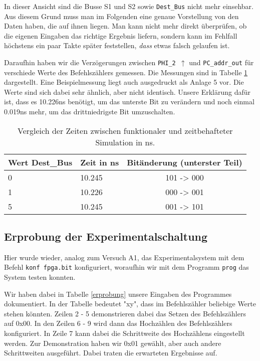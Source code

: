 \documentclass[12pt,a4paper]{scrartcl}
\begin{document}
In dieser Ansicht sind die Busse S1 und S2 sowie \texttt{Dest\_Bus} nicht mehr einsehbar.
Aus diesem Grund muss man im Folgenden eine genaue Vorstellung von den Daten haben, die auf ihnen liegen.
Man kann nicht mehr direkt \"uberpr\"ufen, ob die eigenen Eingaben das richtige Ergebnis liefern, sondern kann im Fehlfall h\"ochstens ein paar Takte sp\"ater feststellen, \emph{dass} etwas falsch gelaufen ist.

Daraufhin haben wir die Verz\"ogerungen zwischen \texttt{PHI\_2 $\uparrow$} und \texttt{PC\_addr\_out} f\"ur verschiede Werte des Befehlsz\"ahlers gemessen.
Die Messungen sind in Tabelle \ref{vergleich} dargestellt.
Eine Beispielmessung liegt auch ausgedruckt als Anlage 5 vor.
Die Werte sind sich dabei sehr \"ahnlich, aber nicht identisch.
Unsere Erkl\"arung daf\"ur ist, dass es 10.226ns ben\"otigt, um das unterste Bit zu ver\"andern und noch einmal 0.019ns mehr, um das drittniedrigste Bit umzuschalten.

\begin{table}[h]
    \centering
    \begin{tabular}{l|l|c}
    \hline
    Wert Dest\_Bus & Zeit in ns & Bit\"anderung (unterster Teil)\\
    \hline
    0              & 10.245     & 101 -> 000 \\ %
    1              & 10.226     & 000 -> 001 \\ %
    5              & 10.245     & 001 -> 101 \\ %
    \hline
    \end{tabular}
    \caption{Vergleich der Zeiten zwischen funktionaler und zeitbehafteter Simulation in ns.}
    \label{vergleich}
\end{table}

\subsection{Erprobung der Experimentalschaltung}

Hier wurde wieder, analog zum Versuch A1, das Experimentalsystem mit dem Befehl \texttt{konf fpga.bit} konfiguriert, woraufhin wir mit dem Programm \texttt{prog} das System testen konnten.

Wir haben dabei in Tabelle \ref{erprobung} unsere Eingaben des Programmes dokumentiert.
In der Tabelle bedeutet "xy", dass im Befehlsz\"ahler beliebige Werte stehen k\"onnten.
Zeilen 2 - 5 demonstrieren dabei das Setzen des Befehlsz\"ahlers auf 0x00.
In den Zeilen 6 - 9 wird dann das Hochz\"ahlen des Befehlsz\"ahlers konfiguriert.
In Zeile 7 kann dabei die Schrittweite des Hochz\"ahlens eingestellt werden.
Zur Demonstration haben wir 0x01 gew\"ahlt, aber auch andere Schrittweiten ausgef\"uhrt.
Dabei traten die erwarteten Ergebnisse auf.
\end{document}
